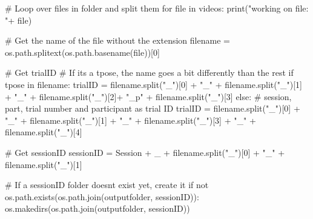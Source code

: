 \documentclass[
  letterpaper,
  DIV=11,
  numbers=noendperiod]{scrreprt}
\newenvironment{Shaded}{\begin{snugshade}}{\end{snugshade}}
\newcommand{\BuiltInTok}[1]{\textcolor[rgb]{0.00,0.23,0.31}{#1}}
\newcommand{\CommentTok}[1]{\textcolor[rgb]{0.37,0.37,0.37}{#1}}
\newcommand{\ControlFlowTok}[1]{\textcolor[rgb]{0.00,0.23,0.31}{#1}}
\newcommand{\DecValTok}[1]{\textcolor[rgb]{0.68,0.00,0.00}{#1}}
\newcommand{\KeywordTok}[1]{\textcolor[rgb]{0.00,0.23,0.31}{#1}}
\newcommand{\NormalTok}[1]{\textcolor[rgb]{0.00,0.23,0.31}{#1}}
\newcommand{\OperatorTok}[1]{\textcolor[rgb]{0.37,0.37,0.37}{#1}}
\newcommand{\StringTok}[1]{\textcolor[rgb]{0.13,0.47,0.30}{#1}}
\begin{document}
\begin{Shaded}
\begin{Highlighting}[]
\CommentTok{\# Loop over files in folder and split them}
\ControlFlowTok{for} \BuiltInTok{file} \KeywordTok{in}\NormalTok{ videos:}
    \BuiltInTok{print}\NormalTok{(}\StringTok{"working on file: "}\OperatorTok{+} \BuiltInTok{file}\NormalTok{)}

    \CommentTok{\# Get the name of the file without the extension}
\NormalTok{    filename }\OperatorTok{=}\NormalTok{ os.path.splitext(os.path.basename(}\BuiltInTok{file}\NormalTok{))[}\DecValTok{0}\NormalTok{]}
    
    \CommentTok{\# Get trialID}
    \CommentTok{\# If it\textquotesingle{}s a tpose, the name goes a bit differently than the rest}
    \ControlFlowTok{if} \StringTok{\textquotesingle{}tpose\textquotesingle{}} \KeywordTok{in}\NormalTok{ filename: }
\NormalTok{        trialID }\OperatorTok{=}\NormalTok{ filename.split(}\StringTok{"\_"}\NormalTok{)[}\DecValTok{0}\NormalTok{] }\OperatorTok{+} \StringTok{"\_"} \OperatorTok{+}\NormalTok{ filename.split(}\StringTok{"\_"}\NormalTok{)[}\DecValTok{1}\NormalTok{] }\OperatorTok{+} \StringTok{"\_"} \OperatorTok{+}\NormalTok{ filename.split(}\StringTok{"\_"}\NormalTok{)[}\DecValTok{2}\NormalTok{]}\OperatorTok{+} \StringTok{"\_p"} \OperatorTok{+}\NormalTok{ filename.split(}\StringTok{"\_"}\NormalTok{)[}\DecValTok{3}\NormalTok{]}
    \ControlFlowTok{else}\NormalTok{:}
        \CommentTok{\# session, part, trial number and participant as trial ID}
\NormalTok{        trialID }\OperatorTok{=}\NormalTok{ filename.split(}\StringTok{"\_"}\NormalTok{)[}\DecValTok{0}\NormalTok{] }\OperatorTok{+} \StringTok{"\_"} \OperatorTok{+}\NormalTok{ filename.split(}\StringTok{"\_"}\NormalTok{)[}\DecValTok{1}\NormalTok{] }\OperatorTok{+} \StringTok{"\_"} \OperatorTok{+}\NormalTok{ filename.split(}\StringTok{"\_"}\NormalTok{)[}\DecValTok{3}\NormalTok{] }\OperatorTok{+} \StringTok{"\_"} \OperatorTok{+}\NormalTok{ filename.split(}\StringTok{"\_"}\NormalTok{)[}\DecValTok{4}\NormalTok{]}

    \CommentTok{\# Get sessionID}
\NormalTok{    sessionID }\OperatorTok{=} \StringTok{\textquotesingle{}Session\textquotesingle{}} \OperatorTok{+} \StringTok{\textquotesingle{}\_\textquotesingle{}} \OperatorTok{+}\NormalTok{ filename.split(}\StringTok{"\_"}\NormalTok{)[}\DecValTok{0}\NormalTok{] }\OperatorTok{+} \StringTok{"\_"} \OperatorTok{+}\NormalTok{ filename.split(}\StringTok{"\_"}\NormalTok{)[}\DecValTok{1}\NormalTok{]}

    \CommentTok{\# If a sessionID folder doesn\textquotesingle{}t exist yet, create it}
    \ControlFlowTok{if} \KeywordTok{not}\NormalTok{ os.path.exists(os.path.join(outputfolder, sessionID)):}
\NormalTok{        os.makedirs(os.path.join(outputfolder, sessionID))    }


\end{Highlighting}
\end{Shaded}
\end{document}

